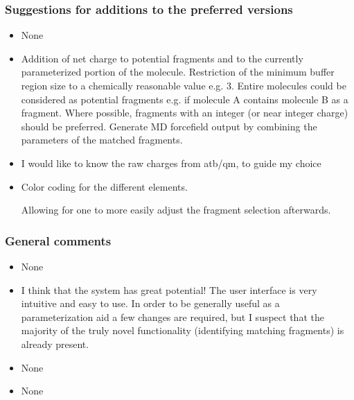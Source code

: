 \subsubsection{Suggestions for additions to the preferred versions}
\begin{itemize}
\item None

\item Addition of net charge to potential fragments and to the currently parameterized portion of the molecule. Restriction of the minimum buffer region size to a chemically reasonable value e.g. 3. Entire molecules could be considered as potential fragments e.g. if molecule A contains molecule B as a fragment. Where possible, fragments with an integer (or near integer charge) should be preferred. Generate MD forcefield output by combining the parameters of the matched fragments.

\item I would like to know the raw charges from atb/qm, to guide my choice

\item Color coding for the different elements.





Allowing for one to more easily adjust the fragment selection afterwards.

\end{itemize}


\subsubsection{General comments}
\begin{itemize}
\item None

\item I think that the system has great potential! The user interface is very intuitive and easy to use. In order to be generally useful as a parameterization aid a few changes are required, but I suspect that the majority of the truly novel functionality (identifying matching fragments) is already present. 

\item None

\item None

\end{itemize}


